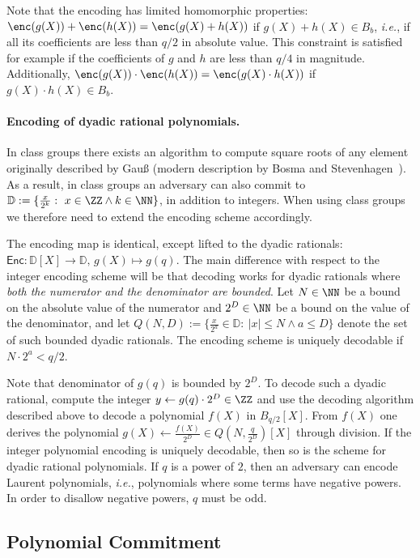 \documentclass{article}
\theoremstyle{definition}
\begin{document}
Note that the encoding has limited homomorphic properties: $\enc(g(X))+\enc(h(X))=\enc(g(X)+h(X))$ if $g(X)+h(X)\in B_{b}$, \emph{i.e.}, if all its coefficients are less than $q/2$ in absolute value. This constraint is satisfied for example if the coefficients of $g$ and $h$ are less than $q/4$ in magnitude. Additionally, $\enc(g(X))\cdot \enc(h(X))=\enc(g(X)\cdot h(X))$ if $g(X)\cdot h(X)\in B_{b}$.

\paragraph{Encoding of dyadic rational polynomials.}
In class groups there exists an algorithm to compute square roots of any element originally described by Gauß (modern description by Bosma and Stevenhagen~\cite{jtn/BosSte96}). As a result, in class groups an adversary can also commit to  $\mathbb{D}:=\{\frac{x}{2^k} : \ x \in \ZZ \wedge k \in \NN\}$, in addition to integers. When using class groups we therefore need to extend the encoding scheme accordingly. 

The encoding map is identical, except lifted to the dyadic rationals: $\mathsf{Enc} : \mathbb{D}[X] \rightarrow \mathbb{D}, \, g(X) \mapsto g(q)$. The main difference with respect to the integer encoding scheme will be that decoding works for dyadic rationals where \emph{both the numerator and the denominator are bounded}. Let $N \in \NN$ be a bound on the absolute value of the numerator and $2^D\in \NN$ be a bound on the value of the denominator, and let $Q(N, D) :=\{\frac{x}{2^a} \in \mathbb{D} : \ |x|\leq N \wedge a \leq D\}$ denote the set of such bounded dyadic rationals. The encoding scheme is uniquely decodable if $N \cdot 2^a < q/2$.
 
Note that denominator of $g(q)$ is bounded by $2^D$. To decode such a dyadic rational, compute the integer $y \gets g(q) \cdot 2^{D}\in \ZZ$  and use the decoding algorithm described above to decode a polynomial $f(X)$ in $B_{q/2}[X]$. From $f(X)$ one derives the polynomial  $g(X) \gets \frac{f(X)}{2^D} \in Q(N, \frac{q}{2^D})[X]$ through division. If the integer polynomial encoding is uniquely decodable, then so is the scheme for dyadic rational polynomials. If $q$ is a power of $2$, then an adversary can encode Laurent polynomials, \emph{i.e.}, polynomials where some terms have negative powers. In order to disallow negative powers, $q$ must be odd.

\subsection{Polynomial Commitment}
\end{document}
